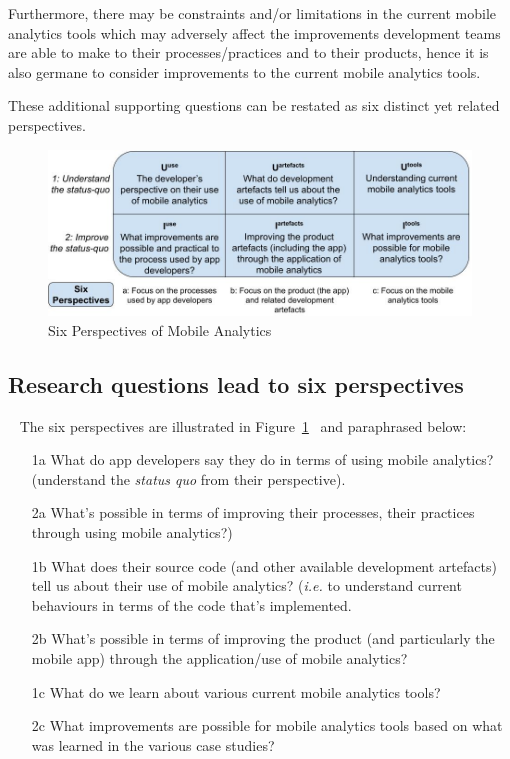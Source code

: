 Furthermore, there may be constraints and/or limitations in the current mobile analytics tools which may adversely affect the improvements development teams are able to make to their processes/practices and to their products, hence it is also germane to consider improvements to the current mobile analytics tools.

These additional supporting questions can be restated as six distinct yet related perspectives.

\begin{figure}
    \includegraphics[width=\linewidth]{images/my/six-perspectives-2x3-matrix-12-nov-2021.jpeg}
    \caption{Six Perspectives of Mobile Analytics}
    \label{fig:six-perspectives-in-the-research-questions-section}
\end{figure}

\subsection{Research questions lead to six perspectives}~\label{rq-leads-to-six-perspectives}
The six perspectives are illustrated in Figure~\ref{fig:six-perspectives-in-the-research-questions-section}~ and paraphrased below:

\begin{enumerate}
    \item [1a] What do app developers say they do in terms of using mobile analytics? (understand the \emph{status quo} from their perspective).
    \item [2a] What's possible in terms of improving their processes, their practices through using mobile analytics?)
    \item [1b] What does their source code (and other available development artefacts) tell us about their use of mobile analytics? (\emph{i.e.} to understand current behaviours in terms of the code that's implemented.
    \item [2b] What's possible in terms of improving the product (and particularly the mobile app) through the application/use of mobile analytics?
    \item [1c] What do we learn about various current mobile analytics tools?
    \item [2c] What improvements are possible for mobile analytics tools based on what was learned in the various case studies?
\end{enumerate}


